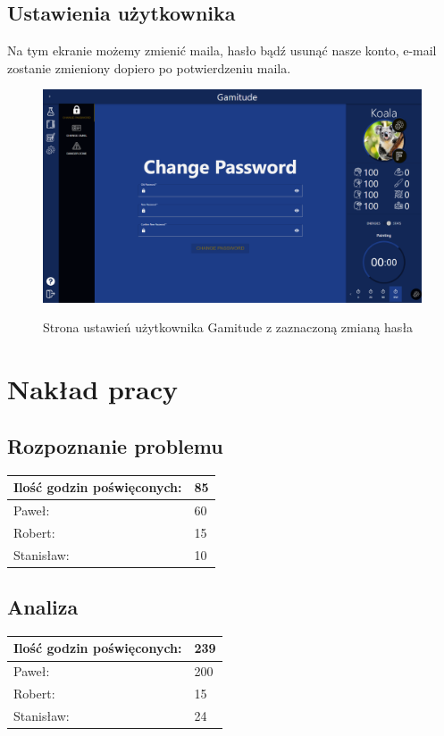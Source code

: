 \documentclass[a4paper,11pt]{report}
\begin{document}
\section{Ustawienia użytkownika}
Na tym ekranie możemy zmienić maila, hasło bądź usunąć nasze konto, e-mail zostanie zmieniony dopiero po potwierdzeniu maila.
\begin{figure}[H]
	\centering
	\includegraphics[scale=0.3]{prezentacja/Settings}\\
	\caption{Strona ustawień użytkownika Gamitude z zaznaczoną zmianą hasła}
	\label{fig:Settings}
\end{figure}

\chapter{Nakład pracy}
\section{Rozpoznanie problemu}
\begin{tabular}{|l|l|}
\hline
Ilość godzin poświęconych: & 85\\
\hline
Paweł: & 60\\
\hline
Robert: & 15\\
\hline
Stanisław: & 10\\
\hline
\end{tabular}

\section{Analiza}
\begin{tabular}{|l|l|}
\hline
Ilość godzin poświęconych: & 239\\
\hline
Paweł: & 200\\
\hline
Robert: & 15\\
\hline
Stanisław: & 24\\
\hline
\end{tabular}
\end{document}

